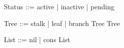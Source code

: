 \documentclass[a4paper,10pt,fleqn]{article}
\begin{document}
\begin{zed}Status ::= active | inactive | pending\end{zed}

\begin{zed}
Tree ::= stalk | leaf \ldata \nat \rdata | branch \ldata Tree \cross Tree \rdata
\end{zed}

\begin{zed}
List ::= nil | cons \ldata \nat \cross List \rdata
\end{zed}
\end{document}
